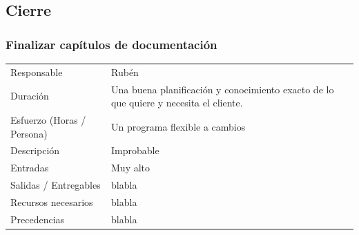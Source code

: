 \subsection{Cierre}
\subsubsection{Finalizar cap\'{i}tulos de documentaci\'{o}n}
\begin{table}[H]
    \begin{center}
        \begin{tabular}{l p{8cm}}
            Responsable                           & Rub\'{e}n \\
            Duraci\'{o}n                          & Una buena planificación y conocimiento exacto de lo que quiere y necesita el cliente. \\ 
            Esfuerzo (Horas / Persona)            & Un programa flexible a cambios \\
            Descripci\'{o}n                       & Improbable \\
            Entradas                              & Muy alto\\
            Salidas / Entregables                 & blabla \\
            Recursos necesarios                   & blabla \\
            Precedencias                          & blabla \\
        \end{tabular}
    \end{center}
    
\end{table}

